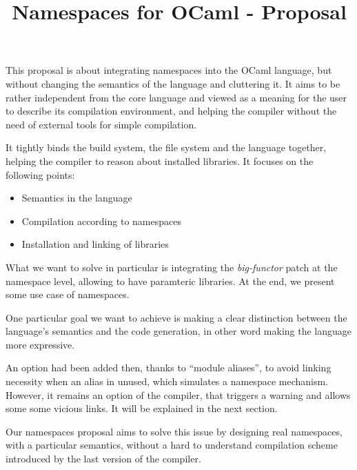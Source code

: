 \documentclass[11pt,a4paper]{article}
\title{Namespaces for OCaml - Proposal}
\begin{document}
\maketitle

This proposal is about integrating namespaces into the OCaml language, but
without changing the semantics of the language and cluttering it. It aims to be
rather independent from the core language and viewed as a meaning for the user to
describe its compilation environment, and helping the compiler without the need
of external tools for simple compilation.

It tightly binds the build system, the file system and the language together,
helping the compiler to reason about installed libraries.
It focuses on the following points:
\begin{itemize}
\item Semantics in the language
\item Compilation according to namespaces
\item Installation and linking of libraries
\end{itemize}

What we want to solve in particular is integrating the \emph{big-functor} patch
at the namespace level, allowing to have paramteric libraries. At the end, we
present some use case of namespaces.

One particular goal we want to achieve is making a clear distinction between the
language's semantics and the code generation, in other word making the language
more expressive. %

An option had been added then, thanks to ``module aliases'', to avoid linking
necessity when an alias in unused, which simulates a namespace
mechanism. However, it remains an option of the compiler, that triggers a
warning and allows some some vicious links. It will be explained in the next
section.

Our namespaces proposal aims to solve this issue by designing real namespaces,
with a particular semantics, without a hard to understand compilation scheme
introduced by the last version of the compiler.






\end{document}
